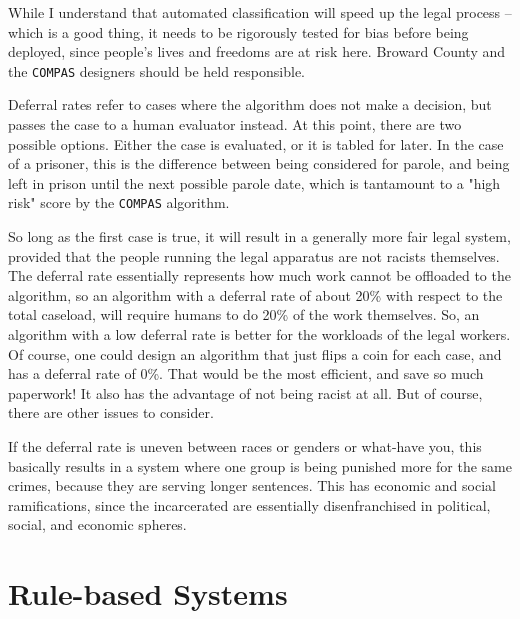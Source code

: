 \documentclass[11pt,largemargins, anonymous]{homework}
\begin{document}
\begin{arabicparts}
    While I understand that automated classification will speed up the legal process -- which is a good thing,
    it needs to be rigorously tested for bias before being deployed,
    since people's lives and freedoms are at risk here.
    Broward County and the \texttt{COMPAS} designers should be held responsible.

    \questionpart

    Deferral rates refer to cases where the algorithm does not make a decision,
    but passes the case to a human evaluator instead.
    At this point, there are two possible options.
    Either the case is evaluated, or it is tabled for later.
    In the case of a prisoner, this is the difference between being considered for parole,
    and being left in prison until the next possible parole date,
    which is tantamount to a "high risk" score by the \texttt{COMPAS} algorithm.

    So long as the first case is true, it will result in a generally more fair legal system,
    provided that the people running the legal apparatus are not racists themselves.
    The deferral rate essentially represents how much work cannot be offloaded to the algorithm,
    so an algorithm with a deferral rate of about 20\% with respect to the total caseload,
    will require humans to do 20\% of the work themselves.
    So, an algorithm with a low deferral rate is better for the workloads of the legal workers.
    Of course, one could design an algorithm that just flips a coin for each case,
    and has a deferral rate of 0\%.
    That would be the most efficient, and save so much paperwork!
    It also has the advantage of not being racist at all.
    But of course, there are other issues to consider.

    If the deferral rate is uneven between races or genders or what-have you,
    this basically results in a system where one group is being punished more for the same crimes,
    because they are serving longer sentences.
    This has economic and social ramifications,
    since the incarcerated are essentially disenfranchised in political, social, and economic spheres.

    \questionpart

    

\end{arabicparts}

\part{Rule-based Systems}
\end{document}
